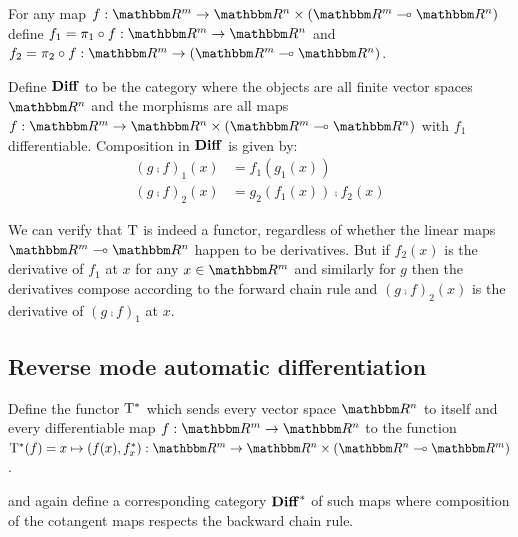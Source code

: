 For any map $f: \RR^m \to \RR^n \times (\RR^m \linearto \RR^n)$ define $f_1 = \pi_1 \comp f: \RR^m \to \RR^n$
and $f_2 = \pi_2 \comp f: \RR^m \to (\RR^m \linearto \RR^n)$.

\begin{definition}[$\Diff$]
\label{def:auto-diff:Diff}
Define $\Diff$ to be the category where the objects are all finite vector spaces $\RR^n$ and the morphisms
are all maps $f: \RR^m \to \RR^n \times (\RR^m \linearto \RR^n)$ with $f_1$ differentiable. Composition in
$\Diff$ is given by:
\begin{align*}
(g \comp f)_1(x) &= f_1(g_1(x)) \\
(g \comp f)_2(x) &= g_2(f_1(x)) \comp f_2(x)
\end{align*}
\end{definition}

We can verify that $\mathrm{T}$ is indeed a functor, regardless of whether the linear maps $\RR^m \linearto
\RR^n$ happen to be derivatives. But if $f_2(x)$ is the derivative of $f_1$ at $x$ for any $x \in \RR^m$ and
similarly for $g$ then the derivatives compose according to the forward chain rule and $(g \comp f)_2(x)$ is
the derivative of $(g \comp f)_1$ at $x$.

\subsection{Reverse mode automatic differentiation}

\begin{definition}
Define the functor $\mathrm{T}^*$ which sends every vector space $\RR^n$ to itself and every differentiable map
$f: \RR^m \to \RR^n$ to the function $\cotangents(f) = x \mapsto (f(x), \pullf{f}_x): \RR^m \to \RR^n \times
(\RR^n \linearto \RR^m)$.
\end{definition}

\noindent and again define a corresponding category $\mathbf{Diff}^*$ of such maps where composition of the cotangent
maps respects the backward chain rule. 
